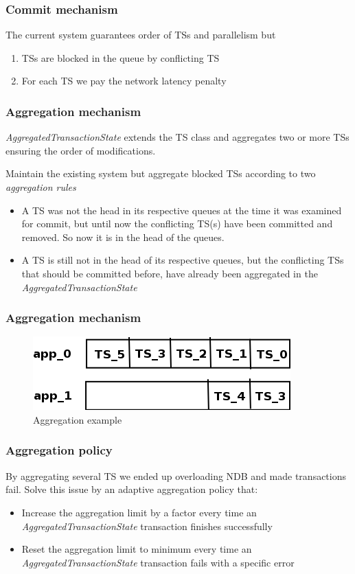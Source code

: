 \documentclass{beamer}
\begin{document}
\begin{frame}
\frametitle{Commit mechanism}

The current system guarantees order of TSs and parallelism but

\begin{enumerate}
\item TSs are blocked in the queue by conflicting TS
\item For each TS we pay the network latency penalty
\end{enumerate}
\end{frame}

\begin{frame}
\frametitle{Aggregation mechanism}
\emph{AggregatedTransactionState} extends the TS class and aggregates
two or more TSs ensuring the order of modifications.

Maintain the existing system but aggregate blocked TSs according to
two \emph{aggregation rules}

\begin{itemize}
\item<+-> A TS was not the head in its respective queues at the time
  it was examined for commit, but until now the conflicting TS(s) have
  been committed and removed. So now it is in the head of the queues.

\item<+-> A TS is still not in the head of its respective queues, but
  the conflicting TSs that should be committed before, have already
  been aggregated in the \emph{AggregatedTransactionState}
\end{itemize}
\end{frame}

\begin{frame}
\frametitle{Aggregation mechanism}

\begin{figure}
\centering
\includegraphics[scale=0.5]{resources/commit_system_aggr_example.png}
\caption{Aggregation example}
\end{figure}
\end{frame}

\begin{frame}
\frametitle{Aggregation policy}
By aggregating several TS we ended up overloading NDB and made
transactions fail. Solve this issue by an adaptive aggregation policy
that:

\begin{itemize}
\item Increase the aggregation limit by a factor every time an
  \emph{AggregatedTransactionState} transaction finishes successfully
\item Reset the aggregation limit to minimum every time an
  \emph{AggregatedTransactionState} transaction fails with a specific error
\end{itemize}

\end{frame}
\end{document}
